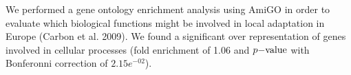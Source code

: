  We performed a gene ontology enrichment analysis using AmiGO in order to evaluate which biological functions might be involved in local adaptation in Europe (Carbon et al. 2009). 
 We found a significant over representation of genes involved in cellular processes (fold enrichment of 1.06 and $p{\rm -value}$ with Bonferonni correction of $2.15 e^{-02}$).


% 
% 
% 
% 
% 
% 
% 
% 
% 



